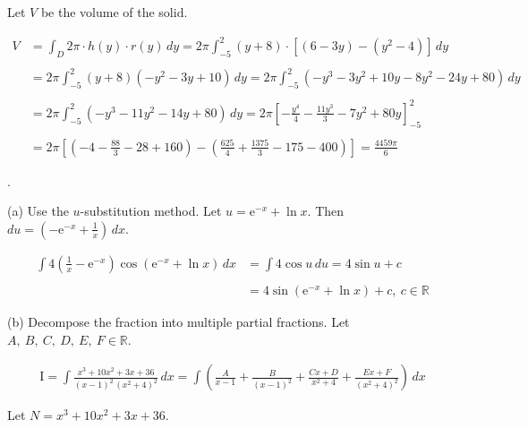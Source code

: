 \documentclass{article}
\begin{document}
\noindent Let $V$ be the volume of the solid.

\begin{align*}
V&=\int_D2\pi\cdot h(y)\cdot r(y)\,dy=2\pi\int_{-5}^2(y+8)\cdot\left[(6-3y)-(y^2-4)\right]\,dy\\\\&=2\pi\int_{-5}^2(y+8)(-y^2-3y+10)\,dy=2\pi\int_{-5}^2\left(-y^3-3y^2+10y-8y^2-24y+80\right)\,dy\\\\&=2\pi\int_{-5}^2\left(-y^3-11y^2-14y+80\right)\,dy=2\pi\left[-\frac{y^4}4-\frac{11y^3}3-7y^2+80y\right]_{-5}^2\\\\&=2\pi\left[\left(-4-\frac{88}3-28+160\right)-\left(\frac{625}4+\frac{1375}3-175-400\right)\right]=\boxed{\frac{4459\pi}6}
\end{align*}

\newpage

.

\hfill

\noindent (a) Use the $u$-substitution method. Let $u=\mathrm{e}^{-x}+\ln x$. Then $\displaystyle du=\left(-\mathrm{e}^{-x}+\frac1x\right)\,dx$.

\begin{align*}\int4\left(\frac1x-\mathrm{e}^{-x}\right)\cos\left(\mathrm{e}^{-x}+\ln x\right)\,dx&=\int4\cos u\,du=4\sin u+c\\\\&=\boxed{4\sin\left(\mathrm{e}^{-x}+\ln x\right)+c,\:c\in\mathbb{R}}\end{align*}

\hfill

\noindent (b) Decompose the fraction into multiple partial fractions. Let $A,\:B,\:C,\:D,\:E,\:F\in\mathbb{R}$.

\begin{align*}\mathrm{I}=\int\frac{x^3+10x^2+3x+36}{(x-1)^2\,\left(x^2+4\right)^2}\,dx=\int\left(\frac{A}{x-1}+\frac{B}{(x-1)^2}+\frac{Cx+D}{x^2+4}+\frac{Ex+F}{(x^2+4)^2}\right)\,dx\end{align*}

\hfill

\noindent Let $N=x^3+10x^2+3x+36$.
\end{document}
